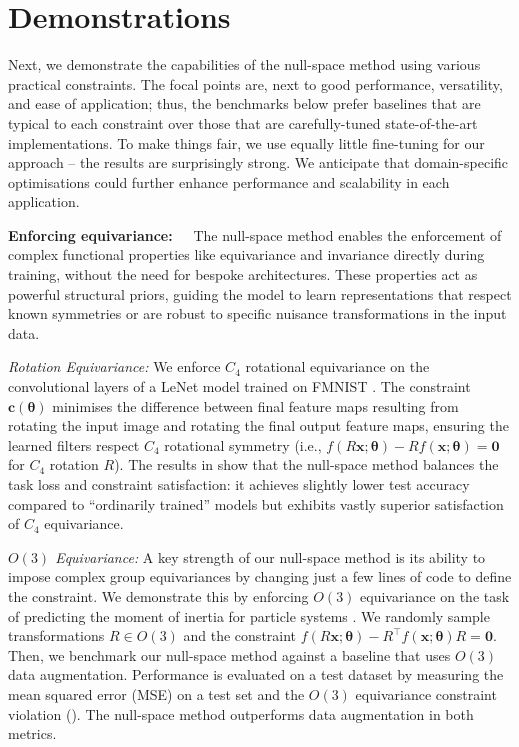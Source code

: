 \section{Demonstrations}
\label{sec:constr_experiments}
Next, we demonstrate the capabilities of the null-space method using various practical constraints. 
The focal points are, next to good performance, versatility, and ease of application; thus, the benchmarks below prefer baselines that are typical to each constraint over those that are carefully-tuned state-of-the-art implementations.
To make things fair, we use equally little fine-tuning for our approach -- the results are surprisingly strong. 
We anticipate that domain-specific optimisations could further enhance performance and scalability in each application. 

\textbf{Enforcing equivariance:~~}
The null-space method enables the enforcement of complex functional properties like equivariance and invariance directly during training, without the need for bespoke architectures. These properties act as powerful structural priors, guiding the model to learn representations that respect known symmetries or are robust to specific nuisance transformations in the input data.

\textit{Rotation Equivariance:} We enforce $C_4$ rotational equivariance \citep{cohen2016group} on the convolutional layers of a LeNet \citep{726791} model trained on FMNIST \citep{xiao2017fashion}. The constraint $\mathbf{c}(\mathbf{\theta})$ minimises the difference between final feature maps resulting from rotating the input image and rotating the final output feature maps, ensuring the learned filters respect $C_4$ rotational symmetry (i.e., $f(R\mathbf{x}; \mathbf{\theta}) - R f(\mathbf{x}; \mathbf{\theta}) = \mathbf{0}$ for $C_4$ rotation $R$). The results in  show that the null-space method balances the task loss and constraint satisfaction: it achieves slightly lower test accuracy compared to ``ordinarily trained'' models but exhibits vastly superior satisfaction of $C_4$ equivariance.

\textit{$O(3)$ Equivariance:}
A key strength of our null-space method is its ability to impose complex group equivariances by changing just a few lines of code to define the constraint. We demonstrate this by enforcing $O(3)$ equivariance on the task of predicting the moment of inertia for particle systems \citep{finzi2021practical}. We randomly sample transformations $R\in O(3)$ and the constraint $f(R\mathbf{x}; \mathbf{\theta}) - R^\top f(\mathbf{x} ; \mathbf{\theta}) R = \mathbf{0}$.
Then, we benchmark our null-space method against a baseline that uses $O(3)$ data augmentation. Performance is evaluated on a test dataset by measuring the mean squared error (MSE) on a test set and the $O(3)$ equivariance constraint violation (). The null-space method outperforms data augmentation in both metrics.

